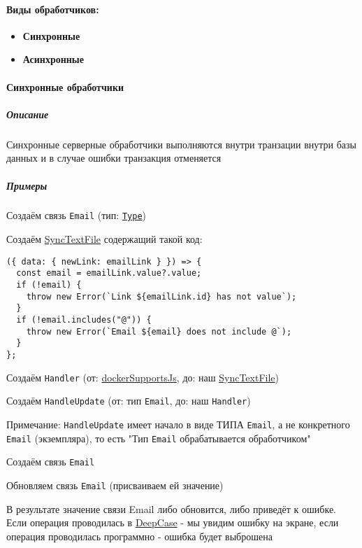 \documentclass{article}
\begin{document}
\paragraph{Виды обработчиков:}
\begin{itemize}
  \item \textbf{Синхронные}
  \item \textbf{Асинхронные}
\end{itemize}

\paragraph{Синхронные обработчики}
\subparagraph{Описание}

Синхронные серверные обработчики выполняются внутри транзации внутри базы
данных и в случае ошибки
транзакция отменяется
\subparagraph{Примеры}

Создаём связь \texttt{Email} (тип: \texttt{\hyperlink{type.Def}{Type}})

Создаём \hyperlink{SyncTextFile.Def}{SyncTextFile} содержащий такой код:

\begin{lstlisting}
({ data: { newLink: emailLink } }) => {
  const email = emailLink.value?.value;
  if (!email) {
    throw new Error(`Link ${emailLink.id} has not value`);
  }
  if (!email.includes("@")) {
    throw new Error(`Email ${email} does not include @`);
  }
};
\end{lstlisting}

Создаём \texttt{Handler} (от:
\hyperlink{dockerSupportsJs.Def}{dockerSupportsJs}, до: наш
\hyperlink{SyncTextFile.Def}{SyncTextFile})

Создаём \texttt{HandleUpdate} (от: тип \texttt{Email}, до: наш
\texttt{Handler})

Примечание: \texttt{HandleUpdate} имеет начало в виде ТИПА \texttt{Email}, а
не конкретного \texttt{Email} (экземпляра), то есть "Тип \texttt{Email}
обрабатывается обработчиком"

Создаём связь \texttt{Email}

Обновляем связь \texttt{Email} (присваиваем ей значение)

В результате значение связи Email либо обновится, либо приведёт к ошибке.
Если операция проводилась в \hyperlink{DeepCase.Def}{DeepCase} - мы увидим
ошибку на экране, если
операция проводилась программно - ошибка будет выброшена
\end{document}
